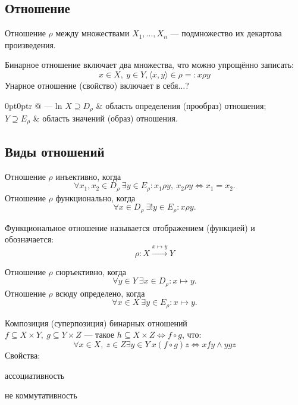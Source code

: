 \subsection{Отношение}

{\bold Отношение} $\rho$ между множествами $X_1,\dots,X_n$ --- подмножество их {\ital декартова произведения}.

\begin{theorem}
{\bold Бинарное} отношение включает {\ital два} множества, что можно упрощённо записать:
$$x\in X,\ y\in Y, \langle x, y\rangle\in\rho=:x\rho y$$
{\bold Унарное} отношение {\ital\color{desc} (свойство)} включает в себя...?
\end{theorem}

\begin{tabularc}{0pt}{0pt}{r @{ --- } l}{n}
$X\supseteq D_\rho$ & область определения {\ital (прообраз)} отношения;\\
$Y\supseteq E_\rho$ & область значений {\ital (образ)} отношения.
\end{tabularc} 

\subsection{Виды отношений}

Отношение $\rho$ {\ital инъективно}, когда
$$\forall x_1,x_2\in D_\rho\ \exists y\in E_\rho\colon x_1\rho y,\ x_2\rho y\iff
x_1=x_2.$$
Отношение $\rho$ {\ital функционально}, когда
$$\forall x\in D_\rho\ \exists! y\in E_\rho\colon x\rho y.$$
\begin{theorem}
Функциональное отношение называется {\bold отображением} {\ital (функцией)}
и обозначается:
$$\rho\colon X\xrightarrow{x\mapsto y} Y$$
\end{theorem}
Отношение $\rho$ {\ital сюръективно}, когда
$$\forall y\in Y\ \exists x\in D_\rho\colon x\mapsto y.$$
Отношение $\rho$ {\ital всюду определено}, когда
$$\forall x\in X\ \exists y\in E_\rho\colon x\mapsto y.$$
\begin{theorem}
{\bold Композиция} {\ital (суперпозиция)} бинарных отношений\\ $f\subseteq X\times Y,\ g\subseteq Y\times Z$ --- такое $h\subseteq X\times Z\iff f\circ g$, что:
$$\forall x\in X,\ z\in Z\exists y\in Y\ x(f\circ g)z\iff xfy\land ygz$$
Свойства:

\begin{list*}
\item ассоциативность
\item {\ital *не коммутативность}
\end{list*}
\end{theorem}

